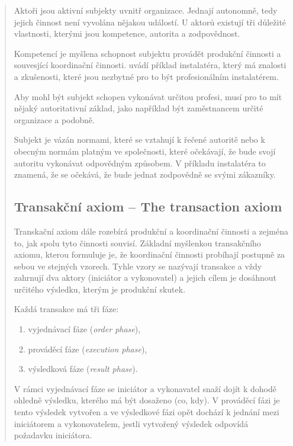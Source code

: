 \documentclass[]{article}
\begin{document}
\begin{quote}
Aktoři jsou aktivní subjekty uvnitř organizace. Jednají autonomně, tedy jejich činnost není vyvolána nějakou událostí. \cite{Dietz2006} U aktorů existují tři důležité vlastnosti, kterými jsou kompetence, autorita a zodpovědnost.

Kompetencí je myšlena schopnost subjektu provádět produkční činnosti a souvesjící koordinační činnosti. \cite{Dietz2006} uvádí příklad instalatéra, který má znalosti a zkušenosti, které jsou nezbytné pro to být profesionálním instalatérem.

Aby mohl být subjekt schopen vykonávat určitou profesi, musí pro to mít nějaký autoritativní základ, jako například být zaměstnancem určité organizace a podobně.

Subjekt je vázán normami, které se vztahují k řečené autoritě nebo k obecným normám platným ve společnosti, které očekávají, že bude svojí autoritu vykonávat odpovědným způsobem. V příkladu instalatéra to znamená, že se očekává, že bude jednat zodpovědně se svými zákazníky.

\subsection{Transakční axiom – The transaction axiom}
Transkační axiom dále rozebírá produkční a koordinační činnosti a zejména to, jak spolu tyto činnosti souvisí. Základní myšlenkou transakčního axiomu, kterou formuluje \cite{Dietz2006} je, že koordinační činnosti probíhají postupně za sebou ve stejných vzorech. Tyhle vzory se nazývají transakce a vždy zahrnují dva aktory (iniciátor a vykonovatel) a jejich cílem je dosáhnout určitého výsledku, kterým je produkční skutek.

Každá transakce má tři fáze:

\begin{enumerate}
\item vyjednávací fáze (\textit{order phase}),
\item prováděcí fáze (\textit{execution phase}),
\item výsledková fáze (\textit{result phase}).
\end{enumerate}

V rámci vyjednávací fáze se iniciátor a vykonavatel snaží dojít k dohodě ohledně výsledku, kterého má být dosaženo (co, kdy). V prováděcí fázi je tento výsledek vytvořen a ve výsledkové fázi opět dochází k jednání mezi iniciátorem a vykonovatelem, jestli vytvořený výsledek odpovídá požadavku iniciátora.


\end{quote}
\end{document}
